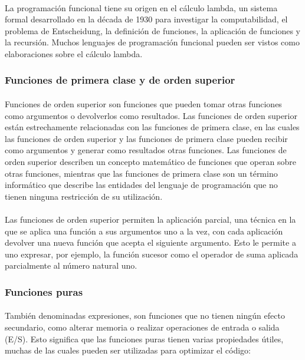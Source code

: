 \documentclass{standalone}
\begin{document}
\paragraph{}
La programación funcional tiene su origen en el cálculo lambda, un sistema formal desarrollado en la década de 1930 para investigar la computabilidad, el problema de Entscheidung, la definición de funciones, la aplicación de funciones y la recursión. Muchos lenguajes de programación funcional pueden ser vistos como elaboraciones sobre el cálculo lambda.

\subsubsection{Funciones de primera clase y de orden superior}
\paragraph{}
Funciones de orden superior son funciones que pueden tomar otras funciones como argumentos o devolverlos como resultados. Las funciones de orden superior están estrechamente relacionadas con las funciones de primera clase, en las cuales las funciones de orden superior y las funciones de primera clase pueden recibir como argumentos y generar como resultados otras funciones. Las funciones de orden superior describen un concepto matemático de funciones que operan sobre otras funciones, mientras que las funciones de primera clase son un término informático que describe las entidades del lenguaje de programación que no tienen ninguna restricción de su utilización.

\paragraph{}
Las funciones de orden superior permiten la aplicación parcial, una técnica en la que se aplica una función a sus argumentos uno a la vez, con cada aplicación devolver una nueva función que acepta el siguiente argumento. Esto le permite a uno expresar, por ejemplo, la función sucesor como el operador de suma aplicada parcialmente al número natural uno.

\subsubsection{Funciones puras}
\paragraph{}
También denominadas expresiones, son funciones que no tienen ningún efecto secundario, como alterar memoria o realizar operaciones de entrada o salida (E/S). Esto significa que las funciones puras tienen varias propiedades útiles, muchas de las cuales pueden ser utilizadas para optimizar el código:
\end{document}
